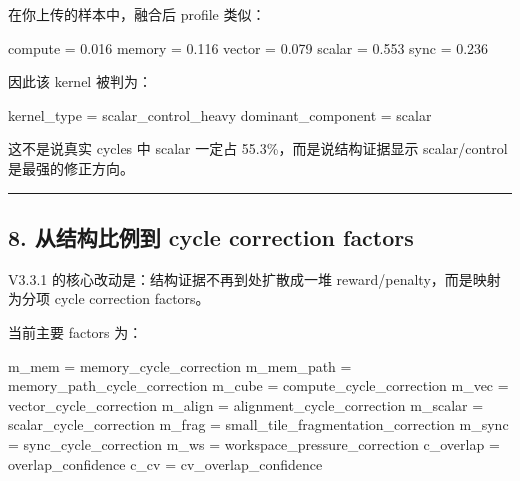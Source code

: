 \documentclass[
  10pt,
]{article}
\newenvironment{Shaded}{}{}
\newcommand{\NormalTok}[1]{#1}
\begin{document}
在你上传的样本中，融合后 profile 类似：

\begin{Shaded}
\begin{Highlighting}[]
\NormalTok{compute = 0.016}
\NormalTok{memory  = 0.116}
\NormalTok{vector  = 0.079}
\NormalTok{scalar  = 0.553}
\NormalTok{sync    = 0.236}
\end{Highlighting}
\end{Shaded}

因此该 kernel 被判为：

\begin{Shaded}
\begin{Highlighting}[]
\NormalTok{kernel\_type = scalar\_control\_heavy}
\NormalTok{dominant\_component = scalar}
\end{Highlighting}
\end{Shaded}

这不是说真实 cycles 中 scalar 一定占 55.3\%，而是说结构证据显示
scalar/control 是最强的修正方向。

\begin{center}\rule{0.5\linewidth}{0.5pt}\end{center}

\subsection{8. 从结构比例到 cycle correction
factors}\label{ux4eceux7ed3ux6784ux6bd4ux4f8bux5230-cycle-correction-factors}

V3.3.1 的核心改动是：结构证据不再到处扩散成一堆
reward/penalty，而是映射为分项 cycle correction factors。

当前主要 factors 为：

\begin{Shaded}
\begin{Highlighting}[]
\NormalTok{m\_mem       = memory\_cycle\_correction}
\NormalTok{m\_mem\_path  = memory\_path\_cycle\_correction}
\NormalTok{m\_cube      = compute\_cycle\_correction}
\NormalTok{m\_vec       = vector\_cycle\_correction}
\NormalTok{m\_align     = alignment\_cycle\_correction}
\NormalTok{m\_scalar    = scalar\_cycle\_correction}
\NormalTok{m\_frag      = small\_tile\_fragmentation\_correction}
\NormalTok{m\_sync      = sync\_cycle\_correction}
\NormalTok{m\_ws        = workspace\_pressure\_correction}
\NormalTok{c\_overlap   = overlap\_confidence}
\NormalTok{c\_cv         = cv\_overlap\_confidence}
\end{Highlighting}
\end{Shaded}
\end{document}
